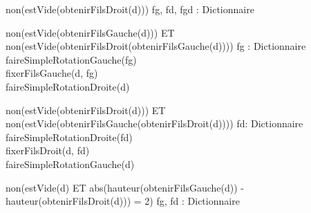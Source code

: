 \begin{algorithme}
	{}%
	{non(estVide(obtenirFilsDroit(d)))}%
	{fg, fd, fgd : Dictionnaire}%
	{
	}
\end{algorithme}


\begin{algorithme}
	{}%
	{non(estVide(obtenirFilsGauche(d))) ET\\ non(estVide(obtenirFilsDroit(obtenirFilsGauche(d))))}%
	{fg : Dictionnaire}%
	{
	\\
	faireSimpleRotationGauche(fg)\\
	fixerFilsGauche(d, fg)\\
	faireSimpleRotationDroite(d)\\
	}
\end{algorithme}

\begin{algorithme}
	{}%
	{non(estVide(obtenirFilsDroit(d))) ET\\ non(estVide(obtenirFilsGauche(obtenirFilsDroit(d))))}%
	{fd: Dictionnaire}%
	{
	\\
	faireSimpleRotationDroite(fd)\\
	fixerFilsDroit(d, fd)\\
	faireSimpleRotationGauche(d)\\
	}
\end{algorithme}

\begin{algorithme}
	{}%
	{non(estVide(d) ET abs(hauteur(obtenirFilsGauche(d)) - hauteur(obtenirFilsDroit(d))) = 2)}%
	{fg, fd : Dictionnaire}%
	{	
		{
			{
			}
			{
			}
		}
		{
			{
			}
			{
			}
		}
	}

\end{algorithme}

